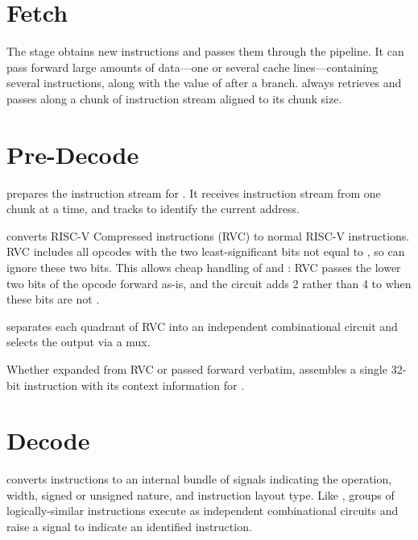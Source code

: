 \section{Fetch}

The  stage obtains new instructions and passes them through the pipeline.  It can pass forward large amounts of data—one or several cache lines—containing several instructions, along with the value of  after a branch.   always retrieves and passes along a chunk of instruction stream aligned to its chunk size.

\section{Pre-Decode}

 prepares the instruction stream for .  It receives instruction stream from  one chunk at a time, and tracks  to identify the current address.

 converts RISC-V Compressed instructions (RVC) to normal RISC-V instructions.  RVC includes all opcodes with the two least-significant bits not equal to , so  can ignore these two bits.  This allows cheap handling of  and :  RVC passes the lower two bits of the opcode forward as-is, and the  circuit adds 2 rather than 4 to  when these bits are not .

 separates each quadrant of RVC into an independent combinational circuit and selects the output via a mux.

Whether expanded from RVC or passed forward verbatim,  assembles a single 32-bit instruction with its context information for .

\section{Decode}

 converts instructions to an internal bundle of signals indicating the operation, width, signed or unsigned nature, and instruction layout type.  Like , groups of logically-similar instructions execute as independent combinational circuits and raise a signal to indicate an identified instruction.

